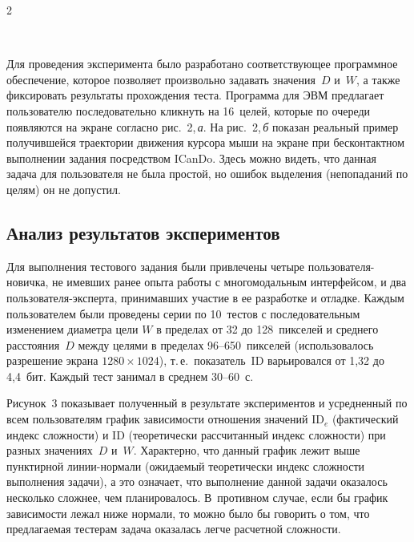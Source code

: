 \begin{multicols}{2}
\begin{figure} %
 \vspace*{1pt}
 \begin{center}
 \mbox{%
 \epsfxsize=157.675mm
 }
 \end{center}
 \vspace*{-9pt}
\end{figure}
 
  
  Для проведения эксперимента было разработано соответствующее 
программное обеспечение, которое позволяет произвольно задавать 
значения~$D$ и~$W$, а также фиксировать результаты прохождения теста. 
Программа для ЭВМ предлагает пользователю последовательно кликнуть на 
16~целей, которые по очереди появляются на экране согласно рис.~2,\,\textit{а}. 
На рис.~2,\,\textit{б} показан реальный пример получившейся траектории 
движения курсора мыши на экране при бесконтактном выполнении задания 
посредством ICanDo. Здесь можно видеть, что данная задача для пользователя 
не была простой, но ошибок выделения (непопаданий по целям) он не 
допустил.


\subsection{Анализ результатов экспериментов}

  Для выполнения тестового задания были привлечены четыре пользователя-новичка, не имевших ранее опыта работы с многомодальным интерфейсом, и 
два пользователя-эксперта, принимавших участие в ее разработке и отладке. 
Каждым пользователем были проведены серии по 10~тестов с 
последовательным изменением диаметра цели $W$ в пределах от 32 до 
128~пикселей и среднего расстояния~$D$ между целями в пределах 
  96--650~пикселей (использовалось разрешение экрана $1280\times1024$), 
т.\,е.\ показатель~ID варьировался от 1,32 до 4,4~бит. Каждый тест занимал в 
среднем 30--60~с.
  
  Рисунок~3 показывает полученный в результате экспериментов и 
усредненный по всем пользователям график зависимости отношения значений 
ID$_e$ (фактический индекс сложности) и ID (теоретически рассчитанный 
индекс сложности) при разных значениях~$D$ и~$W$. Характерно, что данный 
график лежит выше пунктирной ли\-нии-нор\-ма\-ли (ожи\-да\-емый теоретически 
индекс сложности выполнения задачи), а это означает, что выполнение данной 
задачи оказалось несколько сложнее, чем планировалось. В~противном случае, 
если бы график зависимости лежал ниже нормали, то можно было бы говорить 
о том, что предлагаемая тестерам задача оказалась легче расчетной сложности.


\end{multicols}
